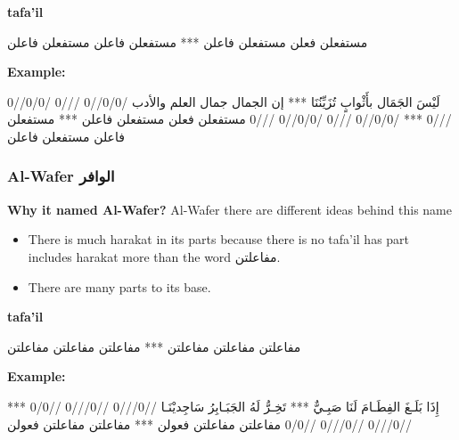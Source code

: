 \textbf{tafa'il}

\begin{Arabic}
	\begin{traditionalpoem*}
مستفعلن فعلن مستفعلن فاعلن *** مستفعلن فاعلن مستفعلن فاعلن


	\end{traditionalpoem*}
      \end{Arabic}


\textbf{Example:}

\begin{Arabic}
	\begin{traditionalpoem*}

لَيْسَ الجَمَال بأَثْوابٍ تُزَيِّنُنَا    ***	إن الجمال جمال العلم والأدب
/0/0//0 ///0 /0/0//0 ///0   ***  /0/0//0 ///0 /0/0//0 ///0
مستفعلن فعلن مستفعلن فاعلن  *** مستفعلن فاعلن مستفعلن فاعلن
	\end{traditionalpoem*}
      \end{Arabic}

\subsubsection{Al-Wafer \textarabic{الوافر}}
\textbf{Why it named Al-Wafer?}
Al-Wafer there are different ideas behind this name
\begin{itemize}
\item There is much harakat in its parts because there is no tafa'il has part includes harakat more than the word \textarabic{مفاعلتن}.
\item There are many parts to its base.\cite{Alkafi1994}
\end{itemize}

\textbf{tafa'il}

\begin{Arabic}
	\begin{traditionalpoem*}

          مفاعلتن مفاعلتن مفاعلتن *** مفاعلتن مفاعلتن مفاعلتن

	\end{traditionalpoem*}
      \end{Arabic}


\textbf{Example:}

\begin{Arabic}
  \begin{traditionalpoem*}
    إِذَا بَلَـغَ الفِطَـامَ لَنَا صَبِـيٌّ *** تَخِـرُّ لَهُ الجَبَـابِرُ سَاجِديْنَـا
    //0///0 //0///0 //0/0 ***  //0///0 //0///0 //0/0
    مفاعلتن مفاعلتن فعولن  *** مفاعلتن مفاعلتن فعولن

	\end{traditionalpoem*}
      \end{Arabic}
\newpage

